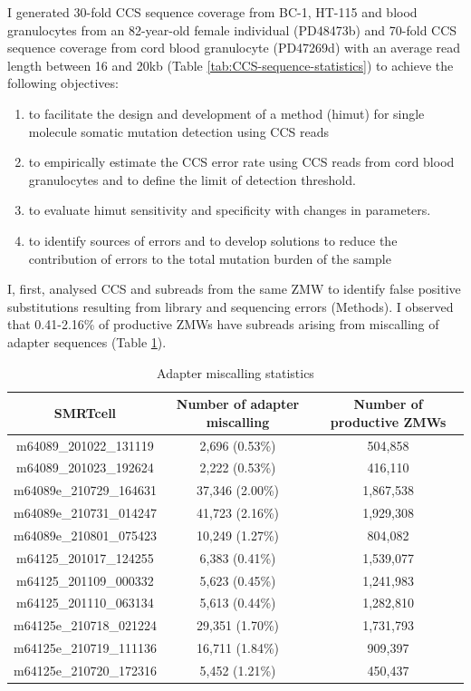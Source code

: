 I generated 30-fold CCS sequence coverage from BC-1, HT-115 and blood granulocytes from an 82-year-old female individual (PD48473b) and 70-fold CCS sequence coverage from cord blood granulocyte (PD47269d) with an average read length between 16 and 20kb (Table \ref{tab:CCS-sequence-statistics}) to achieve the following objectives: 

\begin{enumerate}
\item to facilitate the design and development of a method (himut) for single molecule somatic mutation detection using CCS reads 
\item to empirically estimate the CCS error rate using CCS reads from cord blood granulocytes and to define the limit of detection threshold.
\item to evaluate himut sensitivity and specificity with changes in parameters.
\item to identify sources of errors and to develop solutions to reduce the contribution of errors to the total mutation burden of the sample
\end{enumerate}

I, first, analysed CCS and subreads from the same ZMW to identify false positive substitutions resulting from library and sequencing errors (Methods). I observed that 0.41-2.16\% of productive ZMWs have subreads arising from miscalling of adapter sequences (Table \ref{tab:adapter-miscalling-statistics}).

\begin{table}[h!]
\caption{Adapter miscalling statistics}
\label{tab:adapter-miscalling-statistics}
\begin{tabular}{c|c|c}
SMRTcell & Number of adapter miscalling & Number of productive ZMWs \\ \hline
m64089\_201022\_131119 & 2,696 (0.53\%) & 504,858 \\ \hline
m64089\_201023\_192624 & 2,222 (0.53\%) & 416,110 \\ \hline
m64089e\_210729\_164631 & 37,346 (2.00\%) & 1,867,538 \\ \hline
m64089e\_210731\_014247 & 41,723 (2.16\%) & 1,929,308 \\ \hline
m64089e\_210801\_075423 & 10,249 (1.27\%) & 804,082 \\ \hline
m64125\_201017\_124255 & 6,383 (0.41\%) & 1,539,077 \\ \hline
m64125\_201109\_000332 & 5,623 (0.45\%) & 1,241,983 \\ \hline
m64125\_201110\_063134 & 5,613 (0.44\%) & 1,282,810 \\ \hline
m64125e\_210718\_021224 & 29,351 (1.70\%) & 1,731,793 \\ \hline
m64125e\_210719\_111136 & 16,711 (1.84\%) & 909,397 \\ \hline
m64125e\_210720\_172316 & 5,452 (1.21\%) & 450,437 \\ \hline
\end{tabular}
\end{table}

